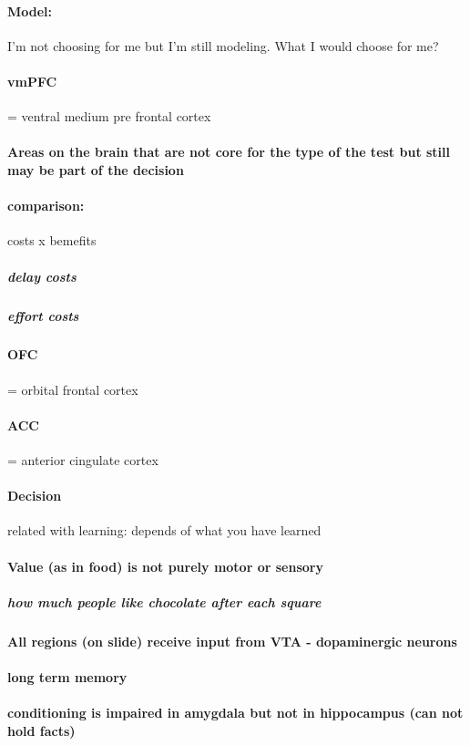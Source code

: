 \documentclass[12pt,article,oneside,a4paper]{memoir}
\begin{document}
\paragraph{Model:} I'm not choosing for me but I'm still modeling. What I would choose for me?
\paragraph{vmPFC} = ventral medium pre frontal cortex
\paragraph{Areas on the brain that are not core for the type of the test but still may be part of the decision}
\paragraph{comparison:} costs x bemefits
\subparagraph{delay costs}
\subparagraph{effort costs}
\paragraph{OFC} = orbital frontal cortex
\paragraph{ACC} = anterior cingulate cortex

\paragraph{Decision} related with learning: depends of what you have learned
\paragraph{Value (as in food) is not purely motor or sensory}
\subparagraph{how much people like chocolate after each square}
\paragraph{All regions (on slide) receive input from VTA - dopaminergic neurons}

\paragraph{long term memory}
\paragraph{conditioning is impaired in amygdala but not in hippocampus (can not hold facts)}
\end{document}
